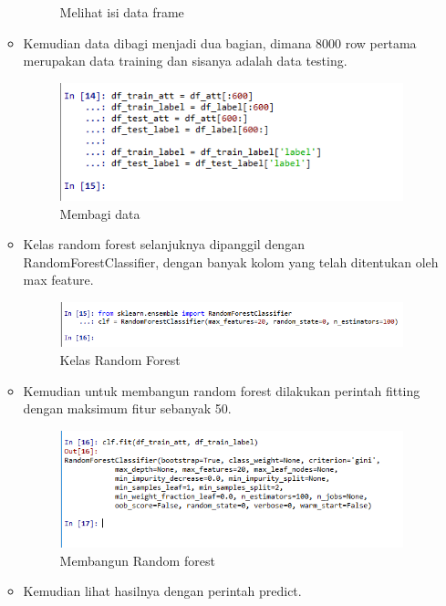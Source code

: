 \begin{enumerate}
\begin{itemize}
\begin{figure}[ht]
			\caption{Melihat isi data frame}
			\label{contoh}
			\end{figure}
		\item Kemudian data dibagi menjadi dua bagian, dimana 8000 row pertama merupakan data training dan sisanya adalah data testing.
			\begin{figure}[ht]
			\centering
			\includegraphics[scale=0.5]{figures/AIP/ai20.PNG}
			\caption{Membagi data}
			\label{contoh}
			\end{figure}
		\item Kelas random forest selanjuknya dipanggil dengan RandomForestClassifier, dengan banyak kolom yang telah ditentukan oleh max feature.
			\begin{figure}[ht]
			\centering
			\includegraphics[scale=0.5]{figures/AIP/ai21.PNG}
			\caption{Kelas Random Forest}
			\label{contoh}
			\end{figure}
		\item Kemudian untuk membangun random forest dilakukan perintah fitting dengan maksimum fitur sebanyak 50.
			\begin{figure}[ht]
			\centering
			\includegraphics[scale=0.5]{figures/AIP/ai22.PNG}
			\caption{Membangun Random forest}
			\label{contoh}
			\end{figure}
		\item Kemudian lihat hasilnya dengan perintah predict.
			\begin{figure}[ht]

\end{figure}
\end{itemize}
\end{enumerate}
